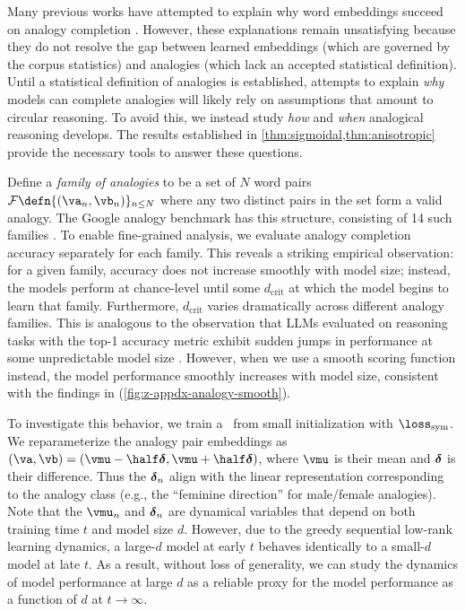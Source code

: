 Many previous works have attempted to explain why word embeddings succeed on analogy completion \citep{gittens2017skip,ethayarajh2018towards,allen2019analogies}. However, these explanations remain unsatisfying because they do not resolve the gap between learned embeddings (which are governed by the corpus statistics) and analogies (which lack an accepted statistical definition). Until a statistical definition of analogies is established, attempts to explain \textit{why} models can complete analogies will likely rely on assumptions that amount to circular reasoning. To avoid this, we instead study \textit{how} and \textit{when} analogical reasoning develops. The results established in \cref{thm:sigmoidal,thm:anisotropic} provide the necessary tools to answer these questions.

Define a \textit{family of analogies} to be a set of $N$ word pairs $\mathcal{F}\defn\{(\va_n,\vb_n)\}_{n\leq N}$ where any two distinct pairs in the set form a valid analogy. The Google analogy benchmark has this structure, consisting of 14 such families \citep{mikolov2013distributed}. To enable fine-grained analysis, we evaluate analogy completion accuracy separately for each family. This reveals a striking empirical observation: for a given family, accuracy does not increase smoothly with model size; instead, the models perform at chance-level until some $d_\mathrm{crit}$ at which the model begins to learn that family. Furthermore, $d_\mathrm{crit}$ varies dramatically across different analogy families. This is analogous to the observation that LLMs evaluated on reasoning tasks with the top-1 accuracy metric exhibit sudden jumps in performance at some unpredictable model size \citep{wei2022emergent}. However, when we use a smooth scoring function instead, the model performance smoothly increases with model size, consistent with the findings in \cite{schaeffer2024emergent} (\cref{fig:z-appdx-analogy-smooth}).

To investigate this behavior, we train a \wem\ from small initialization with $\losssym$. We reparameterize the analogy pair embeddings as $(\va,\vb) = (\vmu-\half\vdelta,\vmu+\half\vdelta)$, where $\vmu$ is their mean and $\boldsymbol{\delta}$ is their difference. Thus the $\boldsymbol{\delta}_n$ align with the linear representation corresponding to the analogy class (e.g., the ``feminine direction'' for male/female analogies). Note that the $\vmu_n$ and $\boldsymbol{\delta}_n$ are dynamical variables that depend on both training time $t$ and model size $d$. However, due to the greedy sequential low-rank learning dynamics, a large-$d$ model at early $t$ behaves identically to a small-$d$ model at late $t$. As a result, without loss of generality, we can study the dynamics of model performance at large $d$ as a reliable proxy for the model performance as a function of $d$ at $t\to\infty$.


